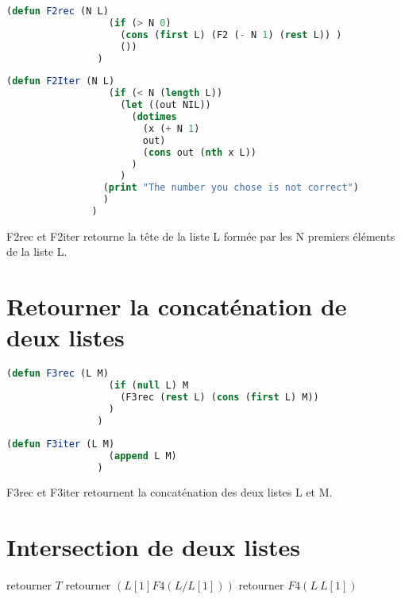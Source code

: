 \documentclass[a4paper, 12pt, leqno]{report}
\theoremstyle{plain}
\begin{document}
            \begin{lstlisting}[label=some-code,caption=F2 (N L) version recursive,language=lisp]
                (defun F2rec (N L)
                  (if (> N 0)
                    (cons (first L) (F2 (- N 1) (rest L)) )
                    ())
                )
            \end{lstlisting}
          
            \begin{lstlisting}[label=some-code,caption=F2 (N L) version itérative,language=lisp]
                (defun F2Iter (N L)
	              (if (< N (length L))
		            (let ((out NIL))
			          (dotimes 
				        (x (+ N 1)
					    out)
					    (cons out (nth x L))
			          )
		            )
		         (print "The number you chose is not correct")
	             )
               )
            \end{lstlisting}        
F2rec et F2iter retourne la tête de la liste L formée par les N premiers éléments de la liste L.
            
            
        \section{Retourner la concaténation de deux listes}
                    
            \begin{lstlisting}[label=some-code,caption=F3 (L M) version recursive,language=lisp]
                (defun F3rec (L M)
                  (if (null L) M
                    (F3rec (rest L) (cons (first L) M))
                  )
                )
            \end{lstlisting}
          
            \begin{lstlisting}[label=some-code,caption=F3 (L M) version itérative,language=lisp]
                (defun F3iter (L M)
                  (append L M)
                )
            \end{lstlisting}       
F3rec et F3iter retournent la concaténation des deux listes L et M.


        \newpage
        
        \section{Intersection de deux listes}
            \begin{algorithm}
            \caption{Algorithme pour l'intersection de deux listes}
            \begin{algorithmic}
                \State retourner $T$
                     \State retourner $(L[1] F4(L / L[1]))$
            \Else                   
                    \State retourner $F4(L \ L[1])$
            \EndIf        
            \end{algorithmic}
            \end{algorithm}
            
\end{document}
